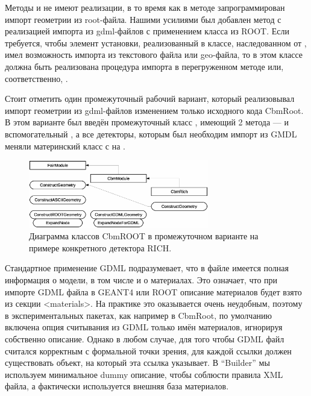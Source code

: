 Методы  и  не имеют реализации, в то время как в методе  запрограммирован импорт геометрии из root-файла. \todo Нашими усилиями был добавлен метод  с реализацией импорта из gdml-файлов с применением класса  из ROOT.
Если требуется, чтобы элемент установки, реализованный в классе, наследованном от , имел возможность импорта из текстового файла или geo-файла, то в этом классе должна быть реализована процедура импорта в перегруженном методе  или, соответственно, .


Стоит отметить один промежуточный рабочий вариант, который реализовывал импорт геометрии из gdml-файлов изменением только исходного кода CbmRoot. В этом варианте был введён промежуточный класс , имеющий 2 метода ---  и вспомогательный , а все детекторы, которым был необходим импорт из GMDL меняли материнский класс с  на .

\begin{figure}[H]
\centering
\includegraphics[width=0.7\textwidth]{pictures/FairModule_classes_after.eps}
\caption{Диаграмма классов CbmROOT в промежуточном варианте на примере конкретного детектора RICH.}
\label{fig:classesAfter}
\end{figure}


Стандартное применение GDML подразумевает, что в файле имеется полная информация о модели, в том числе и о материалах. Это означает, что при импорте GDML файла в GEANT4 или ROOT описание материалов будет взято из секции <materials>. На практике это оказывается очень неудобным, поэтому в экспериментальных пакетах, как например в CbmRoot, по умолчанию включена опция считывания из GDML только имён материалов, игнорируя собственно описание. Однако в любом случае, для того чтобы GDML файл считался корректным с формальной точки зрения, для каждой ссылки должен существовать объект, на который эта ссылка указывает. В ``Builder'' мы используем минимальное dummy \todo описание, чтобы соблюсти правила XML файла, а фактически используется внешняя база материалов.


